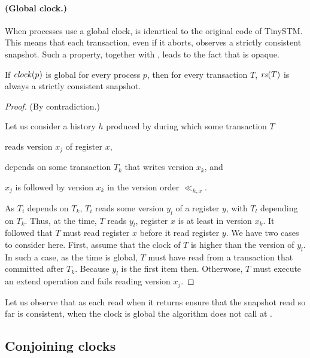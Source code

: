 \paragraph{(Global clock.)}
When processes use a global clock,  is idenrtical to the original code of TinySTM.
This means that each transaction, even if it aborts, observes a strictly consistent snapshot.
Such a property, together with , leads to the fact that  is opaque.

\begin{proposition}
  If $\clockOf{p}$ is global for every process $p$, then for every transaction $T$, $\readSetOf{T}$ is always a strictly consistent snapshot.
\end{proposition}

\begin{proof}
  (By contradiction.)
  
  Let us consider a history $h$ produced by  during which some transaction $T$
  \begin{inparaenum}[\em(i)]
  \item reads version $x_j$ of register $x$,
  \item depends on some transaction $T_k$ that writes version $x_k$, and
  \item $x_j$ is followed by version $x_k$ in the version order $\ll_{h,x}$.
  \end{inparaenum}

  As $T_i$ depends on $T_k$, $T_i$ reads some version $y_l$ of a register $y$, with $T_l$ depending on $T_k$.
  Thus, at the time, $T$ reads $y_l$, register $x$ is at least in version $x_k$.
  It followed that $T$ must read register $x$ before it read register $y$.
  We have two cases to consider here.
  First, assume that the clock of $T$ is higher than the version of $y_l$.
  In such a case, as the time is global, $T$ must have read from a transaction that committed after $T_k$.
  Because $y_l$ is the first item then.
  Otherwose, $T$ must execute an extend operation and fails reading version $x_j$.  
\end{proof}

Let us observe that as each read when it returns ensure that the snapshot read so far is consistent, when the clock is global the algorithm does not call \stmExtend{} at .

\subsection{Conjoining clocks}

